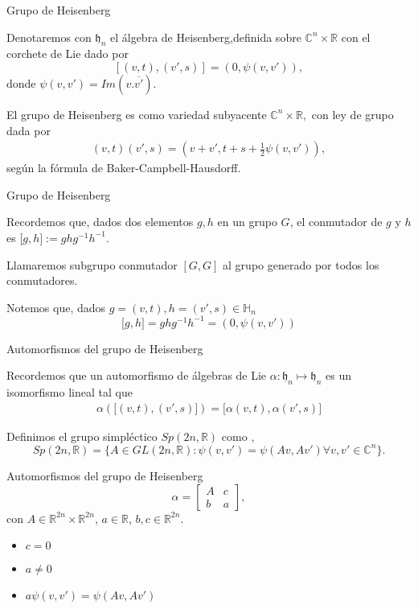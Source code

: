 \documentclass{beamer}
\begin{document}
\begin{frame}{Grupo de Heisenberg}
\begin{definition}
Denotaremos con $\mathfrak{h}_n$ el álgebra de Heisenberg,definida sobre
$\mathbb{C}^n \times \mathbb{R}$  con el corchete de Lie dado por 
$$
[(v,t),(v',s)]=(0,\psi(v,v')),
$$
donde  $\psi (v,v')=Im(v.\overline{v'}).$
\end{definition} 

\begin{definition}
El grupo de Heisenberg es como variedad subyacente $\mathbb{C}^{n}\times \mathbb{R},$ con
ley de grupo dada por 
$$\begin{aligned}
(v,t)(v',s)=(v+v',t+s+ \frac{1}{2} \psi(v,v')),
\end{aligned}$$
según la fórmula de Baker-Campbell-Hausdorff.
\end{definition}
\end{frame}


\begin{frame}{Grupo de Heisenberg}
\begin{definition}
 Recordemos que, dados dos elementos $g,h$ en un grupo $G$, el conmutador de $g$ y $h$ es ${[}g,h{]}:=g h g^{-1} h^{-1}$.
 
 Llamaremos subgrupo conmutador $[G,G]$ al grupo generado por todos los conmutadores.
\end{definition}
Notemos que, dados $g=(v,t),h=(v',s) \in \mathbb{H}_n$
$$
{[}g,h{]}=g h g^{-1} h^{-1}=(0,\psi(v,v'))
$$
\end{frame}

\begin{frame}{Automorfismos del grupo de Heisenberg}
 \begin{definition}
 Recordemos que un automorfismo de álgebras de Lie $\alpha: \mathfrak{h}_n \mapsto \mathfrak{h}_n$ es un isomorfismo lineal tal que 
 $$\begin{aligned}
    \alpha({[}(v,t),(v',s){]})={[}\alpha(v,t),\alpha(v',s){]}
 \end{aligned}$$
\end{definition}
\begin{definition}
 Definimos el grupo simpléctico $Sp(2n,\mathbb{R})$ como ,
 $$
 Sp(2n,\mathbb{R})=\{ A \in GL(2n,\mathbb{R}): \psi(v,v')=\psi(Av,Av') \forall v,v' \in \mathbb{C}^n\}.
 $$
\end{definition}

\end{frame}

\begin{frame}{Automorfismos del grupo de Heisenberg}
$$\alpha=
\begin{bmatrix}
A & c\\
b & a
\end{bmatrix},$$
con $A \in  \mathbb{R}^{2n} \times \mathbb{R}^{2n}$, $a \in \mathbb{R}$, $b,c \in \mathbb{R}^{2n}$.

\begin{itemize}
\item <2-> $c=0$
\item <2-> $a\neq0$
\item <2-> $a \psi(v,v')=\psi(A v,A v')$
\end{itemize}
\end{frame}
\end{document}
